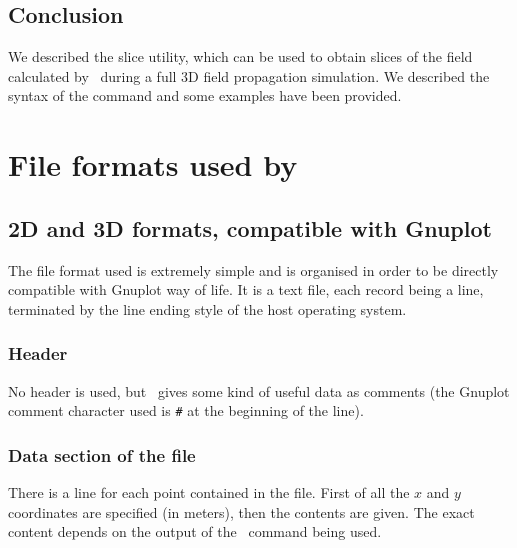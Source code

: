 \section{Conclusion}
We described the \textsf{slice} utility, which can be used to obtain slices of the field calculated by \afmm\ during a full 3D field propagation simulation. We described the syntax of the command and some examples have been provided.

\chapter{File formats used by \afmm}
\section{2D and 3D formats, compatible with Gnuplot}
\label{sec_format_gnuplot}
The file format used is extremely simple and is organised in order to 
be directly compatible with Gnuplot way of life. It is a text file, each record being a line, terminated by the line ending style of the host operating system.

\subsection{Header}        
No header is used, but \afmm\ gives some kind of useful data as comments (the Gnuplot comment character used is \lstinline!#! at the beginning of the line).

\subsection{Data section of the file}
There is a line for each point contained in the file. First of all the $x$ and $y$ coordinates are specified (in meters), then the contents are given. The exact content depends on the output of the \afmm\ command being used.

